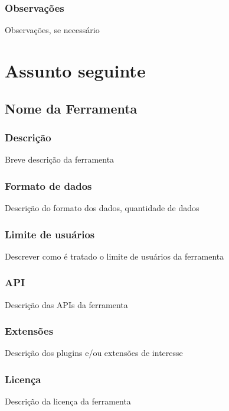 \documentclass[12pt]{article}
\begin{document}
\subsubsection{Observações}
Observações, se necessário

\clearpage


\section{Assunto seguinte}

\subsection{Nome da Ferramenta}

\subsubsection{Descrição}
Breve descrição da ferramenta

\subsubsection{Formato de dados}
Descrição do formato dos dados, quantidade de dados

\subsubsection{Limite de usuários}
Descrever como é tratado o limite de usuários da ferramenta

\subsubsection{API}
Descrição das APIs da ferramenta

\subsubsection{Extensões}
Descrição dos plugins e/ou extensões de interesse

\subsubsection{Licença}
Descrição da licença da ferramenta
\end{document}
